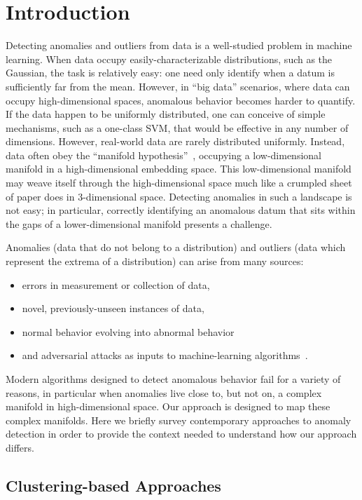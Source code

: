 \section{Introduction}
\label{sec:introduction}

Detecting anomalies and outliers from data is a well-studied problem in machine learning.
When data occupy easily-characterizable distributions, such as the Gaussian, the task is relatively easy: one need only identify when a datum is sufficiently far from the mean.
However, in ``big data'' scenarios, where data can occupy high-dimensional spaces, anomalous behavior becomes harder to quantify.
If the data happen to be uniformly distributed, one can conceive of simple mechanisms, such as a one-class SVM, that would be effective in any number of dimensions.
However, real-world data are rarely distributed uniformly.
Instead, data often obey the ``manifold hypothesis''~\cite{fefferman2016testing}, occupying a low-dimensional manifold in a high-dimensional embedding space.
This low-dimensional manifold may weave itself through the high-dimensional space much like a crumpled sheet of paper does in 3-dimensional space.
Detecting anomalies in such a landscape is not easy;
in particular, correctly identifying an anomalous datum that sits within the gaps of a lower-dimensional manifold presents a challenge.

Anomalies (data that do not belong to a distribution) and outliers (data which represent the extrema of a distribution) can arise from many sources:
\begin{itemize}
    \item errors in measurement or collection of data,
    \item novel, previously-unseen instances of data,
    \item normal behavior evolving into abnormal behavior
    \item and adversarial attacks as inputs to machine-learning algorithms~\cite{elsayed2018adversarial}.
\end{itemize}

Modern algorithms designed to detect anomalous behavior fail for a variety of reasons, in particular when anomalies live close to, but not on, a complex manifold in high-dimensional space.
Our approach is designed to map these complex manifolds.
Here we briefly survey contemporary approaches to anomaly detection in order to provide the context needed to understand how our approach differs.

\subsection{Clustering-based Approaches}
\label{subsec:introduction:clustering-based-approaches}

